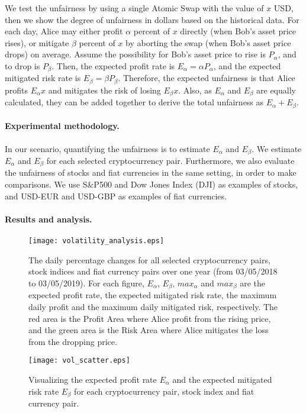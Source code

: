 We test the unfairness by using a single Atomic Swap with the value of $x$ USD, then we show the degree of unfairness in dollars based on the historical data.
For each day, Alice may either profit $\alpha$ percent of $x$ directly (when Bob's asset price rises),
or mitigate $\beta$ percent of $x$ by aborting the swap (when Bob's asset price drops) on average.
Assume the possibility for Bob's asset price to rise is $P_{\alpha}$, and to drop is $P_{\beta}$.
Then, the expected profit rate is $E_{\alpha} = \alpha P_{\alpha}$,
and the expected mitigated risk rate is $E_{\beta} = \beta P_{\beta}$.
Therefore, the expected unfairness is that Alice profits $E_{\alpha} x$ and mitigates the risk of losing $E_{\beta} x$.
Also, as $E_\alpha$ and $E_\beta$ are equally calculated, they can be added together to derive the total unfairness as $E_\alpha + E_\beta$.

\paragraph{Experimental methodology.}
In our scenario, quantifying the unfairness is to estimate $E_{\alpha}$ and $E_{\beta}$.
We estimate $E_{\alpha}$ and $E_{\beta}$ for each selected cryptocurrency pair.
Furthermore,  we also evaluate the unfairness of stocks and fiat currencies in the same setting, in order to make comparisons.
We use S\&P500 and Dow Jones Index (DJI) as examples of stocks, and USD-EUR and USD-GBP as examples of fiat currencies.

\paragraph{Results and analysis.}

\begin{figure*}
    \texttt{[image: volatility\_analysis.eps]}
    \caption{The daily percentage changes for all selected cryptocurrency pairs, stock indices and fiat currency pairs over one year (from 03/05/2018 to 03/05/2019).
    For each figure, $E_{\alpha}$, $E_{\beta}$, $max_\alpha$ and $max_\beta$ are the expected profit rate, the expected mitigated risk rate, the maximum daily profit and the maximum daily mitigated risk, respectively.
    The red area is the Profit Area where Alice profit from the rising price, and the green area is the Risk Area where Alice mitigates the loss from the dropping price.}
    \label{fig:volatility_analysis}
\end{figure*}

\begin{figure}
    \texttt{[image: vol\_scatter.eps]}
    \caption{Visualizing the expected profit rate $E_\alpha$ and the expected mitigated risk rate $E_\beta$ for each cryptocurrency pair, stock index and fiat currency pair.}
    \label{fig:vol_scatter}
\end{figure}

